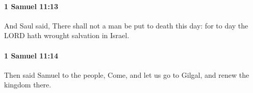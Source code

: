 		\paragraph{1 Samuel 11:13} %
			\label{1SAMUEL-11-13}

			And Saul said, There shall not a man be put to death this day: for to day the LORD hath wrought salvation in Israel.


		\paragraph{1 Samuel 11:14} %
			\label{1SAMUEL-11-14}

			Then said Samuel to the people, Come, and let us go to Gilgal, and renew the kingdom there.


